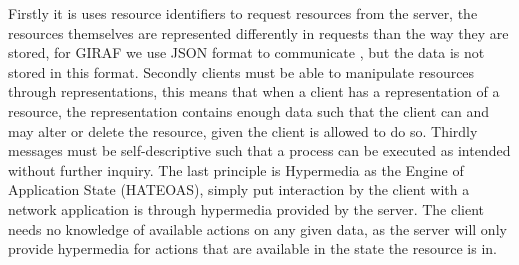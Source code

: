 \begin{description}
    Firstly it is uses resource identifiers to request resources from the server, the resources themselves are represented differently in requests than the way they are stored, for GIRAF we use JSON format to communicate , but the data is not stored in this format.
    Secondly clients must be able to manipulate resources through representations, this means that when a client has a representation of a resource, the representation contains enough data such that the client can and may alter or delete the resource, given the client is allowed to do so.
    Thirdly messages must be self-descriptive such that a process can be executed as intended without further inquiry.
    The last principle is Hypermedia as the Engine of Application State (HATEOAS), simply put interaction by the client with a network application is through hypermedia provided by the server.
    The client needs no knowledge of available actions on any given data, as the server will only provide hypermedia for actions that are available in the state the resource is in.


\end{description}
